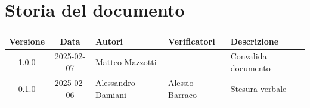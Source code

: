 \section*{Storia del documento}
\begin{tabularx}{\textwidth}{ c c p{2.75cm} p{2.75cm} X }
    \rowcolor{gray!20}\rule{0pt}{0.5cm}\textbf{Versione} & \textbf{Data} & \textbf{Autori} & \textbf{Verificatori} & \textbf{Descrizione} \\[0.7ex]
    \hline
    \rule{0pt}{0.5cm}1.0.0 & 2025-02-07 & Matteo Mazzotti & - & Convalida documento\\[0.7ex]
    \hline
    \rule{0pt}{0.5cm}0.1.0 & 2025-02-06 & Alessandro Damiani & Alessio Barraco & Stesura verbale\\[0.7ex]
\end{tabularx}